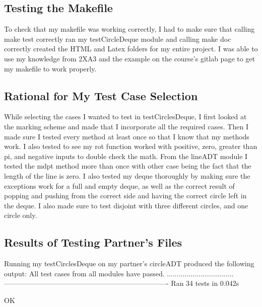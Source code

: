 \documentclass[12pt]{article}
\begin{document}
\subsection{Testing the Makefile}

To check that my makefile was working correctly, I had to make sure that calling make test correctly ran my testCircleDeque module and calling make doc correctly created the HTML and Latex folders for my entire project. I was able to use my knowledge from 2XA3 and the example on the course's gitlab page to get my makefile to work properly.

\subsection{Rational for My Test Case Selection}

While selecting the cases I wanted to test in testCirclesDeque, I first looked at the marking scheme and made that I incorporate all the required cases. Then I made sure I tested every method at least once so that I know that my methods work. I also tested to see my rot function worked with positive, zero, greater than pi, and negative inputs to double check the math. From the lineADT module I tested the mdpt method more than once with other case being the fact that the length of the line is zero. I also tested my deque thoroughly by making sure the exceptions work for a full and empty deque, as well as the correct result of popping and pushing from the correct side and having the correct circle left in the deque. I also made sure to test disjoint with three different circles, and one circle only.

\newpage 

\subsection{Results of Testing Partner's Files}

Running my testCirclesDeque on my partner's circleADT produced the following output:
All test cases from all modules have passed.
..................................
----------------------------------------------------------------------
Ran 34 tests in 0.042s

OK
\end{document}
